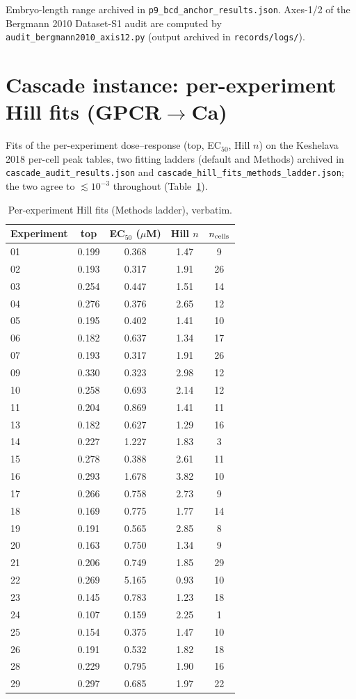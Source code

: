 \documentclass[11pt]{article}
\begin{document}
Embryo-length range archived in \texttt{p9\_bcd\_anchor\_results.json}.
Axes-1/2 of the Bergmann 2010 Dataset-S1 audit are computed by
\texttt{audit\_bergmann2010\_axis12.py} (output archived in \texttt{records/logs/}).

\section{Cascade instance: per-experiment Hill fits (GPCR$\to$Ca)}

Fits of the per-experiment dose--response (top, EC$_{50}$, Hill $n$) on
the Keshelava 2018 per-cell peak tables, two fitting ladders (default and
Methods) archived in \texttt{cascade\_audit\_results.json} and
\texttt{cascade\_hill\_fits\_methods\_ladder.json}; the two agree to
$\lesssim 10^{-3}$ throughout (Table~\ref{tab:hill}).

\begin{table}[h]
\centering\small
\caption{Per-experiment Hill fits (Methods ladder), verbatim.}
\label{tab:hill}
\begin{tabular}{lcccc}
\toprule
Experiment & top & EC$_{50}$ ($\mu$M) & Hill $n$ & $n_{\rm cells}$ \\
\midrule
01 & 0.199 & 0.368 & 1.47 & 9 \\
02 & 0.193 & 0.317 & 1.91 & 26 \\
03 & 0.254 & 0.447 & 1.51 & 14 \\
04 & 0.276 & 0.376 & 2.65 & 12 \\
05 & 0.195 & 0.402 & 1.41 & 10 \\
06 & 0.182 & 0.637 & 1.34 & 17 \\
07 & 0.193 & 0.317 & 1.91 & 26 \\
09 & 0.330 & 0.323 & 2.98 & 12 \\
10 & 0.258 & 0.693 & 2.14 & 12 \\
11 & 0.204 & 0.869 & 1.41 & 11 \\
13 & 0.182 & 0.627 & 1.29 & 16 \\
14 & 0.227 & 1.227 & 1.83 & 3 \\
15 & 0.278 & 0.388 & 2.61 & 11 \\
16 & 0.293 & 1.678 & 3.82 & 10 \\
17 & 0.266 & 0.758 & 2.73 & 9 \\
18 & 0.169 & 0.775 & 1.77 & 14 \\
19 & 0.191 & 0.565 & 2.85 & 8 \\
20 & 0.163 & 0.750 & 1.34 & 9 \\
21 & 0.206 & 0.749 & 1.85 & 29 \\
22 & 0.269 & 5.165 & 0.93 & 10 \\
23 & 0.145 & 0.783 & 1.23 & 18 \\
24 & 0.107 & 0.159 & 2.25 & 1 \\
25 & 0.154 & 0.375 & 1.47 & 10 \\
26 & 0.191 & 0.532 & 1.82 & 18 \\
28 & 0.229 & 0.795 & 1.90 & 16 \\
29 & 0.297 & 0.685 & 1.97 & 22 \\
\bottomrule
\end{tabular}
\end{table}
\end{document}
